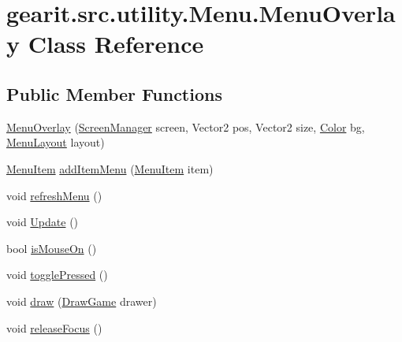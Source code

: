 \hypertarget{classgearit_1_1src_1_1utility_1_1_menu_1_1_menu_overlay}{\section{gearit.\+src.\+utility.\+Menu.\+Menu\+Overlay Class Reference}
\label{classgearit_1_1src_1_1utility_1_1_menu_1_1_menu_overlay}
}
\subsection*{Public Member Functions}
\begin{DoxyCompactItemize}
\item 
\hyperlink{classgearit_1_1src_1_1utility_1_1_menu_1_1_menu_overlay_a479d0f9afacc18452930fc6a2d89388c}{Menu\+Overlay} (\hyperlink{classgearit_1_1xna_1_1_screen_manager}{Screen\+Manager} screen, Vector2 pos, Vector2 size, \hyperlink{classgearit_1_1src_1_1utility_1_1_menu_1_1_menu_overlay_a616844fdcf12eeb1eba0801bb829c6c5}{Color} bg, \hyperlink{namespacegearit_1_1src_1_1utility_1_1_menu_abc08d87596016044edcad828661a6a91}{Menu\+Layout} layout)
\item 
\hyperlink{classgearit_1_1src_1_1utility_1_1_menu_1_1_menu_item}{Menu\+Item} \hyperlink{classgearit_1_1src_1_1utility_1_1_menu_1_1_menu_overlay_a86de87178374c7daaff59b88b5a659a1}{add\+Item\+Menu} (\hyperlink{classgearit_1_1src_1_1utility_1_1_menu_1_1_menu_item}{Menu\+Item} item)
\item 
void \hyperlink{classgearit_1_1src_1_1utility_1_1_menu_1_1_menu_overlay_a7a83ce86bb771b0929c829e96cf3f56d}{refresh\+Menu} ()
\item 
void \hyperlink{classgearit_1_1src_1_1utility_1_1_menu_1_1_menu_overlay_a4230bccd30446967fdcf3a739f6322ea}{Update} ()
\item 
bool \hyperlink{classgearit_1_1src_1_1utility_1_1_menu_1_1_menu_overlay_ac4a1c956b462b91a18837b955435ab66}{is\+Mouse\+On} ()
\item 
void \hyperlink{classgearit_1_1src_1_1utility_1_1_menu_1_1_menu_overlay_a083b241ec859174c9872b5de37ff7736}{toggle\+Pressed} ()
\item 
void \hyperlink{classgearit_1_1src_1_1utility_1_1_menu_1_1_menu_overlay_a44fafedabf091150b5d30acf6337050c}{draw} (\hyperlink{classgearit_1_1src_1_1_draw_game}{Draw\+Game} drawer)
\item 
void \hyperlink{classgearit_1_1src_1_1utility_1_1_menu_1_1_menu_overlay_a46f0ef97c6ce2c7b9031a70d1fecc607}{release\+Focus} ()

\end{DoxyCompactItemize}
